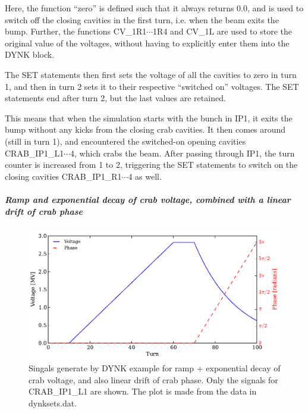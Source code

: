 Here, the function ``zero'' is defined such that it always returns 0.0, and is used to switch off the closing cavities in the first turn, i.e. when the beam exits the bump.
Further, the functions CV\_1R1$\cdots$1R4 and CV\_1L are used to store the original value of the voltages, without having to explicitly enter them into the DYNK block.

The SET statements then first sets the voltage of all the cavities to zero in turn 1, and then in turn 2 sets it to their respective ``switched on'' voltages.
The SET statements end after turn 2, but the last values are retained.

This means that when the simulation starts with the bunch in IP1, it exits the bump without any kicks from the closing crab cavities.
It then comes around (still in turn 1), and encountered the switched-on opening cavities CRAB\_IP1\_L1$\cdots$4, which crabs the beam.
After passing through IP1, the turn counter is increased from 1 to 2, triggering the SET statements to switch on the closing cavities CRAB\_IP1\_R1$\cdots$4 as well.

\subparagraph{Ramp and exponential decay of crab voltage, combined with a linear drift of crab phase}
\begin{figure}
  \centering
  \includegraphics{figures/fail_voltagePhase2v2}
  \caption{Singals generate by DYNK example for ramp + exponential decay of crab voltage, and also linear drift of crab phase. Only the signals for CRAB\_IP1\_L1 are shown. The plot is made from the data in dynksets.dat.}
  \label{fig:DYNK_fail}
\end{figure}

